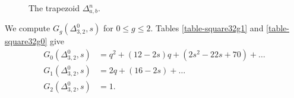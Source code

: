 \begin{figure}[h]
	\centering
{}
    \caption{The trapezoid $\Delta^n_ {a,b}$.}
    \label{fig-trapeze-Hirz}
\end{figure}



\begin{exam} \label{ex-square32}
We compute $G_g(\Delta^0_{3,2},s)$ for $0 \leqslant g \leqslant 2$. Tables \ref{table-square32g1} and \ref{table-square32g0} give
\begin{align*}
G_0(\Delta^0_{3,2},s) &= q^2 + (12-2s)q + (2s^2-22s+70) + \dots  \\
G_1(\Delta^0_{3,2},s) &= 2q + (16-2s) + \dots \\
G_2(\Delta^0_{3,2},s) &= 1 .
\end{align*}
\end{exam}





